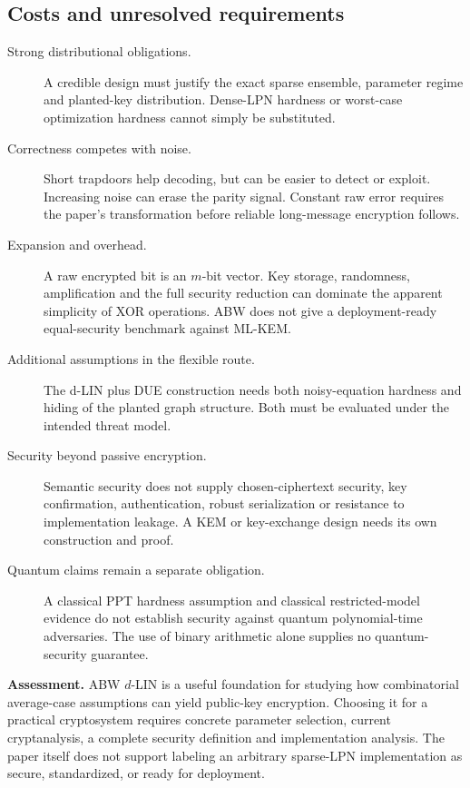 \documentclass[11pt,a4paper]{article}
\begin{document}
\subsection{Costs and unresolved requirements}
\begin{description}
\item[Strong distributional obligations.] A credible design must justify the exact sparse ensemble, parameter regime and planted-key distribution. Dense-LPN hardness or worst-case optimization hardness cannot simply be substituted.
\item[Correctness competes with noise.] Short trapdoors help decoding, but can be easier to detect or exploit. Increasing noise can erase the parity signal. Constant raw error requires the paper's transformation before reliable long-message encryption follows.
\item[Expansion and overhead.] A raw encrypted bit is an $m$-bit vector. Key storage, randomness, amplification and the full security reduction can dominate the apparent simplicity of XOR operations. ABW does not give a deployment-ready equal-security benchmark against ML-KEM.
\item[Additional assumptions in the flexible route.] The d-LIN plus DUE construction needs both noisy-equation hardness and hiding of the planted graph structure. Both must be evaluated under the intended threat model.
\item[Security beyond passive encryption.] Semantic security does not supply chosen-ciphertext security, key confirmation, authentication, robust serialization or resistance to implementation leakage. A KEM or key-exchange design needs its own construction and proof.
\item[Quantum claims remain a separate obligation.] A classical PPT hardness assumption and classical restricted-model evidence do not establish security against quantum polynomial-time adversaries. The use of binary arithmetic alone supplies no quantum-security guarantee.
\end{description}

\textbf{Assessment.} ABW $d$-LIN is a useful foundation for studying how combinatorial average-case assumptions can yield public-key encryption. Choosing it for a practical cryptosystem requires concrete parameter selection, current cryptanalysis, a complete security definition and implementation analysis. The paper itself does not support labeling an arbitrary sparse-LPN implementation as secure, standardized, or ready for deployment.
\end{document}
